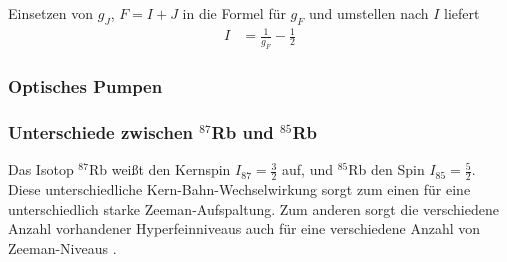 \documentclass[../1-Grundlagenteil.tex]{subfiles}
\begin{document}
    \noindent Einsetzen von $g_J$, $F=I+J$ in die Formel für $g_F$ und umstellen nach $I$ liefert 
    \begin{align}
        I &= \frac{1}{g_F} - \frac{1}{2}
        \label{eq:KernspinFormel}
    \end{align} 

\subsubsection*{Optisches Pumpen}
    
    
\subsubsection*{Unterschiede zwischen $^{87}$Rb und $^{85}$Rb}
    Das Isotop $^{87}$Rb weißt den Kernspin $I_{87}=\frac{3}{2}$ auf, und $^{85}$Rb den Spin $I_{85}=\frac{5}{2}$. Diese unterschiedliche Kern-Bahn-Wechselwirkung sorgt zum einen für eine unterschiedlich starke Zeeman-Aufspaltung. Zum anderen sorgt die verschiedene Anzahl vorhandener Hyperfeinniveaus auch für eine verschiedene Anzahl von Zeeman-Niveaus \cite[180]{Schneider}.
\end{document}
